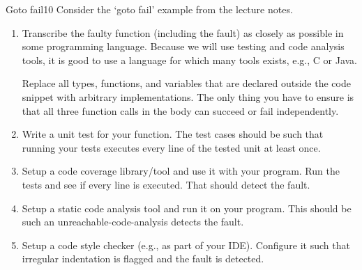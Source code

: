 \documentclass[a4paper]{article}
\begin{document}
\header

\begin{problem}{Goto fail}{10}
Consider the `goto fail' example from the lecture notes.

\begin{enumerate}
\item Transcribe the faulty function (including the fault) as closely as possible in some programming language.
Because we will use testing and code analysis tools, it is good to use a language for which many tools exists, e.g., C or Java.

Replace all types, functions, and variables that are declared outside the code snippet with arbitrary implementations.
The only thing you have to ensure is that all three function calls in the body can succeed or fail independently.

\item Write a unit test for your function.
The test cases should be such that running your tests executes every line of the tested unit at least once.

\item Setup a code coverage library/tool and use it with your program.
Run the tests and see if every line is executed.
That should detect the fault.

\item Setup a static code analysis tool and run it on your program.
This should be such an unreachable-code-analysis detects the fault.

\item Setup a code style checker (e.g., as part of your IDE).
Configure it such that irregular indentation is flagged and the fault is detected.
\end{enumerate}
\end{problem}
\end{document}
